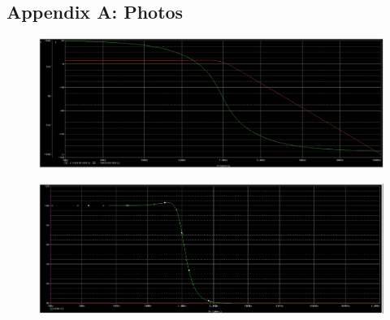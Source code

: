 \documentclass[11pt]{article}
\begin{document}
	\subsection*{Appendix A: Photos}
	\begin{figure}[H]
	\centering
		\includegraphics[width=5.5in]{images/Capture4 (phase info).png}
	\end{figure}
	\begin{figure}[H]
	\centering
		\includegraphics[width=5.5in]{images/CaptureWK2Graph.png}
	\end{figure}
\end{document}
